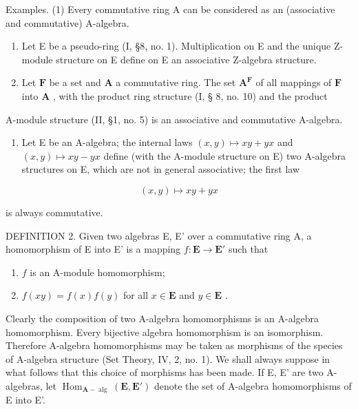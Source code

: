 Examples. (1) Every commutative ring A can be considered as an (associative and commutative) A-algebra.

\begin{enumerate}
\def\labelenumi{(\arabic{enumi})}
\setcounter{enumi}{1}
\item
  Let E be a pseudo-ring (I, §8, no. 1). Multiplication on E and the unique Z-module structure on E define on E an associative Z-algebra structure.
\item
  Let \(\mathbf{F}\) be a set and \(\mathbf{A}\) a commutative ring. The set \(\mathbf{A}^{\mathbf{F}}\) of all mappings of \(\mathbf{F}\) into \(\mathbf{A}\) , with the product ring structure (I, § 8, no. 10) and the product
\end{enumerate}

A-module structure (II, §1, no. 5) is an associative and commutative A-algebra.

\begin{enumerate}
\def\labelenumi{(\arabic{enumi})}
\setcounter{enumi}{3}
\tightlist
\item
  Let E be an A-algebra; the internal laws \((x,y)\mapsto xy+yx\) and \((x,y)\mapsto xy-yx\) define (with the A-module structure on E) two A-algebra structures on E, which are not in general associative; the first law
\end{enumerate}

\[
(x, y) \mapsto x y + y x
\]

is always commutative.

DEFINITION 2. Given two algebras E, E' over a commutative ring A, a homomorphism of E into E' is a mapping \(f: \mathbf{E} \to \mathbf{E}'\) such that

\begin{enumerate}
\def\labelenumi{(\arabic{enumi})}
\item
  \(f\) is an A-module homomorphism;
\item
  \(f(xy) = f(x)f(y)\) for all \(x \in \mathbf{E}\) and \(y \in \mathbf{E}\) .
\end{enumerate}

Clearly the composition of two A-algebra homomorphisms is an A-algebra homomorphism. Every bijective algebra homomorphism is an isomorphism. Therefore A-algebra homomorphisms may be taken as morphisms of the species of A-algebra structure (Set Theory, IV, 2, no. 1). We shall always suppose in what follows that this choice of morphisms has been made. If E, E' are two A-algebras, let \(\operatorname{Hom}_{\mathbf{A}-\operatorname{alg}}(\mathbf{E}, \mathbf{E}')\) denote the set of A-algebra homomorphisms of E into E'.

